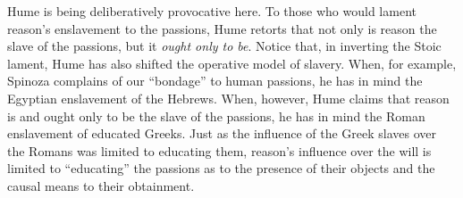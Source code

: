 Hume is being deliberatively provocative here. To those who would lament reason's enslavement to the passions, Hume retorts that not only is reason the slave of the passions, but it \emph{ought only to be}. Notice that, in inverting the Stoic lament, Hume has also shifted the operative model of slavery. When, for example, Spinoza complains of our ``bondage'' to human passions, he has in mind the Egyptian enslavement of the Hebrews. When, however, Hume claims that reason is and ought only to be the slave of the passions, he has in mind the Roman enslavement of educated Greeks. Just as the influence of the Greek slaves over the Romans was limited to educating them, reason's influence over the will is limited to ``educating'' the passions as to the presence of their objects and the causal means to their obtainment. \change

% 


